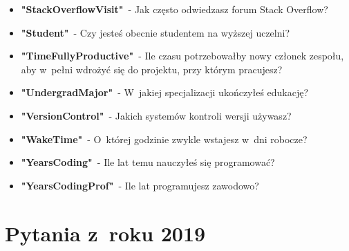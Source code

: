 \begin{appendices}
\begin{itemize}
        \item \textbf{"StackOverflowVisit"}~- Jak często odwiedzasz forum Stack Overflow?
        \item \textbf{"Student"}~- Czy jesteś obecnie studentem na wyższej uczelni?
        \item \textbf{"TimeFullyProductive"}~- Ile czasu potrzebowałby nowy członek zespołu, aby w~pełni wdrożyć się do projektu, przy którym pracujesz?
        \item \textbf{"UndergradMajor"}~- W~jakiej specjalizacji ukończyłeś edukację?
        \item \textbf{"VersionControl"}~- Jakich systemów kontroli wersji używasz?
        \item \textbf{"WakeTime"}~- O~której godzinie zwykle wstajesz w~dni robocze?
        \item \textbf{"YearsCoding"}~- Ile lat temu nauczyłeś się programować?
        \item \textbf{"YearsCodingProf"}~- Ile lat programujesz zawodowo?
    \end{itemize}


    \section{Pytania z~roku 2019}\label{pytania-2019}



\end{appendices}
